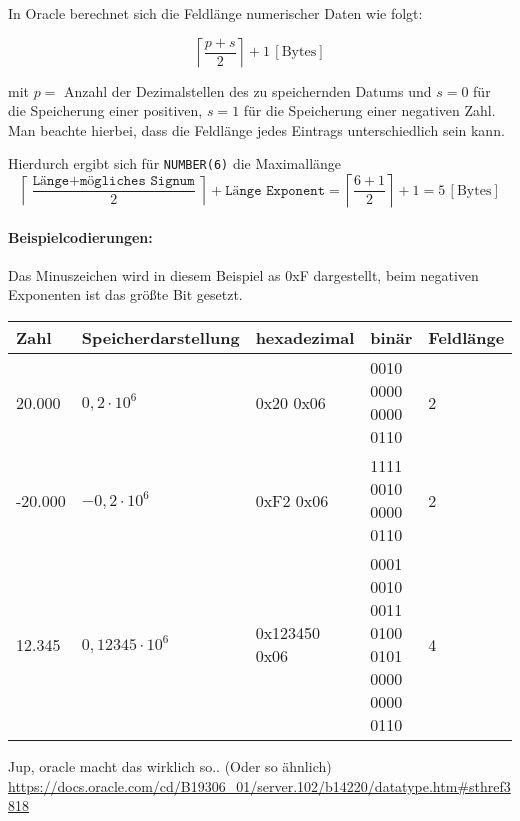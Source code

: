 \begin{solution}
In Oracle berechnet sich die Feldlänge numerischer Daten wie folgt:

\[\left\lceil\frac{p + s}{2}\right\rceil + 1 \, \mathrm{[Bytes]}\]

mit $p =$ Anzahl der Dezimalstellen des zu speichernden Datums und $s = 0$ für die Speicherung einer positiven, $s = 1$ für die Speicherung einer negativen Zahl. Man beachte hierbei, dass die Feldlänge jedes Eintrags unterschiedlich sein kann.

Hierdurch ergibt sich für \texttt{NUMBER(6)} die Maximallänge \[\left\lceil\frac{\texttt{Länge} + \texttt{mögliches Signum}}{2}\right\rceil + \texttt{Länge Exponent} = \left\lceil\frac{6 + 1}{2}\right\rceil + 1 = 5 \, \mathrm{[Bytes]}\]

\paragraph{Beispielcodierungen:}
Das Minuszeichen wird in diesem Beispiel as 0xF dargestellt, beim negativen Exponenten ist das größte Bit gesetzt.\\
\begin{tabular}{lllp{3.5cm}l}
	\hline\hline
	Zahl    & Speicherdarstellung    & hexadezimal   & binär                                   & Feldlänge \\ \hline\hline
	20.000  & $0,\!2\cdot10^6$       & 0x20 0x06     & 0010 0000 0000 0110                     & 2         \\ \hline
	-20.000 & $-0,\!2\cdot10^{6}$    & 0xF2 0x06     & 1111 0010 0000 0110                     & 2         \\ \hline
	12.345  & $0,\!12345\cdot10^{6}$ & 0x123450 0x06 & 0001 0010 0011 0100 0101 0000 0000 0110 & 4         \\ \hline
\end{tabular}

\end{solution}
\begin{note}
Jup, oracle macht das wirklich so.. (Oder so ähnlich)
\url{https://docs.oracle.com/cd/B19306\_01/server.102/b14220/datatype.htm\#sthref3818}
\end{note}
\beamertxt{\pagebreak}

